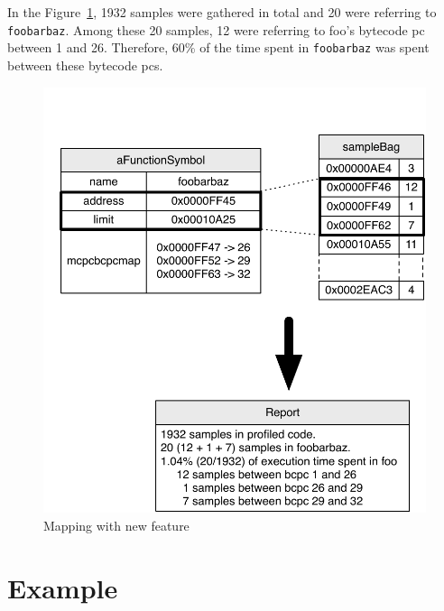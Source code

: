 \documentclass[10pt,nonatbib]{sigplanconf}
\newcommand{\ct}{\lstinline[backgroundcolor=\color{white},basicstyle=\small\ttfamily]}
\newcommand{\figref}[1]{Figure~\ref{fig:#1}}
\begin{document}
In the \figref{NewMapping}, 1932 samples were gathered in total and 20 were referring to \ct{foobarbaz}. Among these 20 samples, 12 were referring to foo's bytecode pc between 1 and 26. Therefore, 60\% of the time spent in \ct{foobarbaz} was spent between these bytecode pcs.


 \begin{figure}[!htp]
     \begin{center}
         \includegraphics[width=1.0\linewidth]{NewMapping}
         \caption{Mapping with new feature}
         \label{fig:NewMapping}
     \end{center}
 \end{figure}
 

\section{Example}
\end{document}
